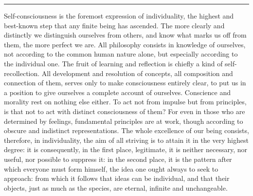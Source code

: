 \documentclass[12pt,a4paper,openany]{book}
\newcommand{\opage}[1]{\marginnote{\footnotesize\textit{[#1]}}}
\newcommand{\sectionrule}{\par\begin{center}\rule{4em}{0.4pt}\end{center}}
\begin{document}
\sectionrule

Self-consciousness is the foremost expression of individuality, the highest and
best-known step that any finite being has ascended. The more clearly and distinctly
we distinguish ourselves from others, and know what marks us off from them, the
more perfect we are. All philosophy consists in knowledge of ourselves, not
according to the common human nature alone, but especially according to the
individual one. The fruit of learning and reflection is chiefly a kind of
self-recollection. All development and resolution of concepts, all composition and
connection of them, serves only to make consciousness entirely clear, to put us in
a position to give ourselves a complete account of ourselves. Conscience and
\setcounter{footnote}{0}%
\opage{104}morality rest on nothing else either. To act not from impulse but from principles, is
that not to act with distinct consciousness of them? For even in those who are
determined by feelings, fundamental principles are at work, though according to
obscure and indistinct representations. The whole excellence of our being consists,
therefore, in individuality, the aim of all striving is to attain it in the very
highest degree: it is consequently, in the first place, legitimate, it is neither
necessary, nor useful, nor possible to suppress it: in the second place, it is the
pattern after which everyone must form himself, the idea one ought always to seek
to approach: from which it follows that ideas can be individual, and that their
objects, just as much as the species, are eternal, infinite and unchangeable.
\end{document}
